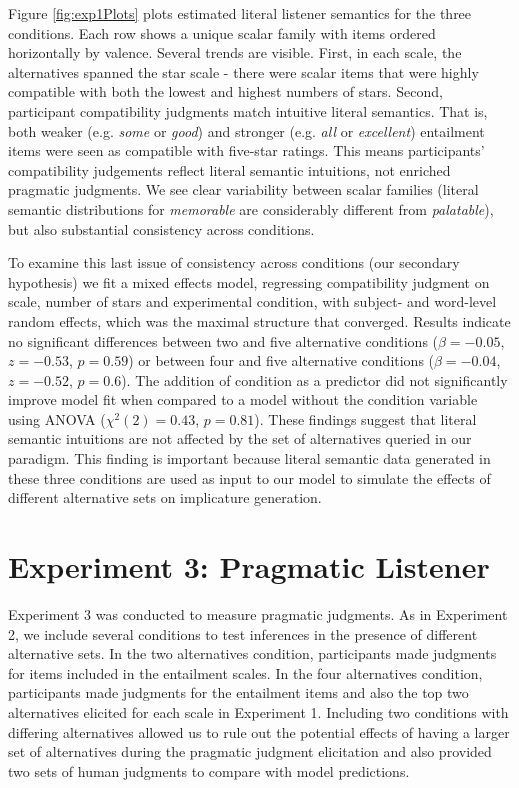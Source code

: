 \documentclass[10pt, letterpaper]{article}
\begin{document}
Figure \ref{fig:exp1Plots} plots estimated literal listener semantics
for the three conditions. Each row shows a unique scalar family with
items ordered horizontally by valence. Several trends are visible.
First, in each scale, the alternatives spanned the star scale - there
were scalar items that were highly compatible with both the lowest and
highest numbers of stars. Second, participant compatibility judgments
match intuitive literal semantics. That is, both weaker (e.g.
\emph{some} or \emph{good}) and stronger (e.g. \emph{all} or
\emph{excellent}) entailment items were seen as compatible with
five-star ratings. This means participants' compatibility judgements
reflect literal semantic intuitions, not enriched pragmatic judgments.
We see clear variability between scalar families (literal semantic
distributions for \emph{memorable} are considerably different from
\emph{palatable}), but also substantial consistency across conditions.

To examine this last issue of consistency across conditions (our
secondary hypothesis) we fit a mixed effects model, regressing
compatibility judgment on scale, number of stars and experimental
condition, with subject- and word-level random effects, which was the
maximal structure that converged. Results indicate no significant
differences between two and five alternative conditions
(\(\beta=-0.05\), \(z = -0.53\), \(p = 0.59\)) or between four and five
alternative conditions (\(\beta = -0.04\), \(z = -0.52\), \(p = 0.6\)).
The addition of condition as a predictor did not significantly improve
model fit when compared to a model without the condition variable using
ANOVA (\(\chi^2(2) = 0.43\), \(p = 0.81\)). These findings suggest that
literal semantic intuitions are not affected by the set of alternatives
queried in our paradigm. This finding is important because literal
semantic data generated in these three conditions are used as input to
our model to simulate the effects of different alternative sets on
implicature generation.

\section{Experiment 3: Pragmatic
Listener}\label{experiment-3-pragmatic-listener}

Experiment 3 was conducted to measure pragmatic judgments. As in
Experiment 2, we include several conditions to test inferences in the
presence of different alternative sets. In the two alternatives
condition, participants made judgments for items included in the
entailment scales. In the four alternatives condition, participants made
judgments for the entailment items and also the top two alternatives
elicited for each scale in Experiment 1. Including two conditions with
differing alternatives allowed us to rule out the potential effects of
having a larger set of alternatives during the pragmatic judgment
elicitation and also provided two sets of human judgments to compare
with model predictions.
\end{document}
